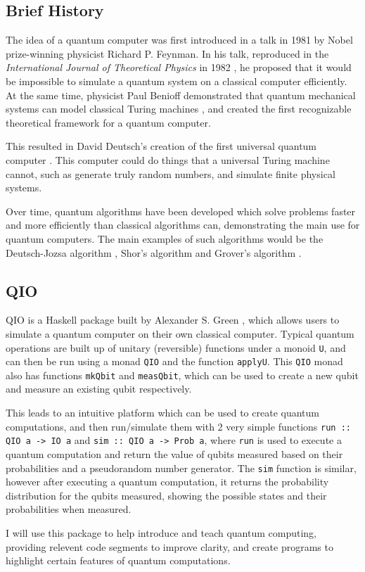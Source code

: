 \documentclass[a4paper,11pt, titlepage, twoside]{article}
\begin{document}
\subsection{Brief History}
The idea of a quantum computer was first introduced in a talk in 1981 by Nobel prize-winning physicist Richard P. Feynman. In his talk, reproduced in the \textit{International Journal of Theoretical Physics} in 1982 \cite{feynman}, he proposed that it would be impossible to simulate a quantum system on a classical computer efficiently. At the same time, physicist Paul Benioff demonstrated that quantum mechanical systems can model classical Turing machines \cite{benioff}, and created the first recognizable theoretical framework for a quantum computer. \par
This resulted in David Deutsch's creation of the first universal quantum computer \cite{deutsch}. This computer could do things that a universal Turing machine cannot, such as generate truly random numbers, and simulate finite physical systems. \par
Over time, quantum algorithms have been developed which solve problems faster and more efficiently than classical algorithms can, demonstrating the main use for quantum computers. The main examples of such algorithms would be the Deutsch-Jozsa algorithm  \cite{deutsch-jozsa}, Shor's algorithm \cite{shor} and Grover's algorithm \cite{grover}.

\subsection{QIO}
QIO is a Haskell package built by Alexander S. Green \cite{qio}, which allows users to simulate a quantum computer on their own classical computer. Typical quantum operations are built up of unitary (reversible) functions under a monoid \texttt{U}, and can then be run using a monad \texttt{QIO} and the function \texttt{applyU}. This \texttt{QIO} monad also has functions \texttt{mkQbit} and \texttt{measQbit}, which can be used to create a new qubit and measure an existing qubit respectively.\par
This leads to an intuitive platform which can be used to create quantum computations, and then run/simulate them with 2 very simple functions \texttt{run :: QIO a -> IO a}  and \texttt{sim :: QIO a -> Prob a}, where \texttt{run} is used to execute a quantum computation and return the value of qubits measured based on their probabilities and a pseudorandom number generator. The \texttt{sim} function is similar, however after executing a quantum computation, it returns the probability distribution for the qubits measured, showing the possible states and their probabilities when measured.\par
I will use this package to help introduce and teach quantum computing, providing relevent code segments to improve clarity, and create programs to highlight certain features of quantum computations.
\end{document}
